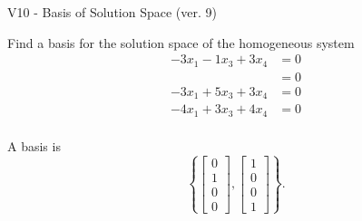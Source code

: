 \begin{exercise}
  \begin{exerciseTitle}V10 - Basis of Solution Space (ver. 9)\end{exerciseTitle}
  \begin{exerciseStatement}
    Find a basis for the solution space of the homogeneous system 
\begin{align*}
 -3 x_ 1 -1 x_ 3 + 3 x_ 4 &= 0  \\ 
  &= 0  \\ 
  -3 x_ 1 + 5 x_ 3 + 3 x_ 4 &= 0  \\ 
  -4 x_ 1 + 3 x_ 3 + 4 x_ 4 &= 0  \\ 
 \end{align*}


 
  \end{exerciseStatement}

  \begin{exerciseAnswer}
   A basis is   
\[\left\{\left[\begin{array}{c}
0 \\
1 \\
0 \\
0
\end{array}\right] , \left[\begin{array}{c}
1 \\
0 \\
0 \\
1
\end{array}\right]\right\}.\]

  


  \end{exerciseAnswer}
\end{exercise}